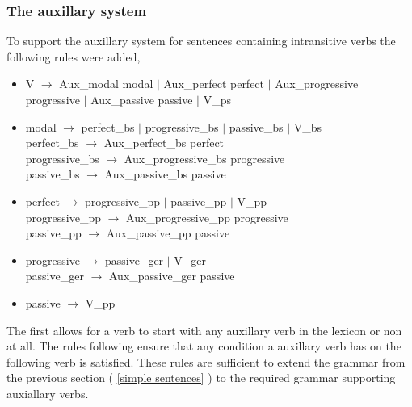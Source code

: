 \documentclass{article}
\begin{document}
\subsubsection{The auxillary system}
To support the auxillary system for sentences containing intransitive verbs the following rules were added,\\
\tiny 
\begin{itemize}
\item V $\rightarrow$ Aux\_modal modal $|$ Aux\_perfect perfect $|$ Aux\_progressive progressive $|$ Aux\_passive passive $|$ V\_ps \\
\item modal $\rightarrow$ perfect\_bs $|$ progressive\_bs $|$ passive\_bs $|$ V\_bs \\
perfect\_bs $\rightarrow$ Aux\_perfect\_bs perfect \\
progressive\_bs $\rightarrow$ Aux\_progressive\_bs progressive \\
passive\_bs $\rightarrow$ Aux\_passive\_bs passive \\
\item perfect $\rightarrow$ progressive\_pp $|$ passive\_pp $|$ V\_pp \\
progressive\_pp $\rightarrow$ Aux\_progressive\_pp progressive \\
passive\_pp $\rightarrow$ Aux\_passive\_pp passive \\
\item progressive $\rightarrow$ passive\_ger $|$ V\_ger \\
passive\_ger $\rightarrow$ Aux\_passive\_ger passive \\
\item passive $\rightarrow$ V\_pp  
\end{itemize}
\normalsize 
The first allows for a verb to start with any auxillary verb in the lexicon or non at all. The rules following ensure that any condition a auxillary verb has on the following verb is satisfied. These rules are sufficient to extend the grammar from the previous section ( \ref{simple sentences} ) to the required grammar supporting auxiallary verbs.
\end{document}
